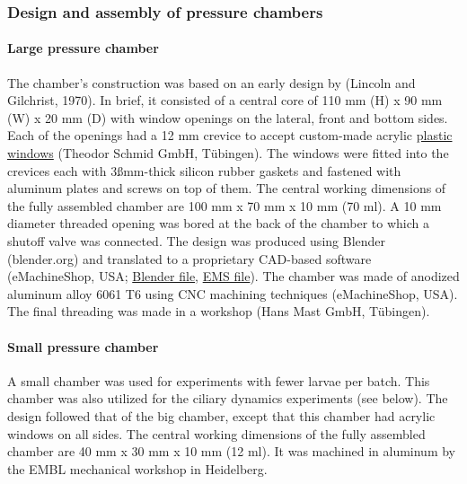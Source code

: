 \documentclass[
  11pt,
]{article}
\let\oldparagraph\paragraph
\renewcommand{\paragraph}[1]{\oldparagraph{#1}\mbox{}}
\begin{document}
\subsubsection{Design and assembly of pressure
chambers}\label{design-and-assembly-of-pressure-chambers}

\paragraph{Large pressure chamber}\label{large-pressure-chamber}

The chamber's construction was based on an early design by (Lincoln and
Gilchrist, 1970). In brief, it consisted of a central core of 110 mm (H)
x 90 mm (W) x 20 mm (D) with window openings on the lateral, front and
bottom sides. Each of the openings had a 12 mm crevice to accept
custom-made acrylic
\href{https://github.com/JekelyLab/Bezares_et_al_2023_Pressure/blob/main/Data/Mechanical_drawings/Zeichnung_Fenster_Bezares2.pdf}{plastic
windows} (Theodor Schmid GmbH, Tübingen). The windows were fitted into
the crevices each with 3ßmm-thick silicon rubber gaskets and fastened
with aluminum plates and screws on top of them. The central working
dimensions of the fully assembled chamber are 100 mm x 70 mm x 10 mm (70
ml). A 10 mm diameter threaded opening was bored at the back of the
chamber to which a shutoff valve was connected. The design was produced
using Blender (blender.org) and translated to a proprietary CAD-based
software (eMachineShop, USA;
\href{https://github.com/JekelyLab/Bezares_et_al_2023_Pressure/blob/main/Data/Mechanical_drawings/Aluminium_Chamber.blend}{Blender
file},
\href{https://github.com/JekelyLab/Bezares_et_al_2023_Pressure/blob/main/Data/Mechanical_drawings/Aluminium_Chamber.ems}{EMS
file}). The chamber was made of anodized aluminum alloy 6061 T6 using
CNC machining techniques (eMachineShop, USA). The final threading was
made in a workshop (Hans Mast GmbH, Tübingen).

\paragraph{Small pressure chamber}\label{small-pressure-chamber}

A small chamber was used for experiments with fewer larvae per batch.
This chamber was also utilized for the ciliary dynamics experiments (see
below). The design followed that of the big chamber, except that this
chamber had acrylic windows on all sides. The central working dimensions
of the fully assembled chamber are 40 mm x 30 mm x 10 mm (12 ml). It was
machined in aluminum by the EMBL mechanical workshop in Heidelberg.
\end{document}
